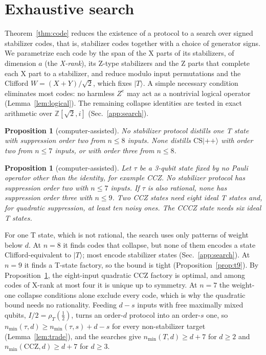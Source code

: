 \documentclass[aps,prl,reprint,twocolumn,amsmath,amssymb,floatfix,nofootinbib,superscriptaddress]{revtex4-2}
\newtheorem{proposition}[theorem]{Proposition}
\newcommand{\CCZ}{\mathrm{CCZ}}
\newcommand{\CS}{\mathrm{CS}}
\newcommand{\TNmax}{8}
\begin{document}
\section{Exhaustive search}
Theorem~\ref{thm:code} reduces the existence of a protocol to a search over signed stabilizer codes, that is, stabilizer codes together with a choice of generator signs. We parametrize each code by the span of the X parts of its stabilizers, of dimension $a$ (the \emph{X-rank}), its Z-type stabilizers and the Z parts that complete each X part to a stabilizer, and reduce modulo input permutations and the Clifford $W=(X+Y)/\sqrt2$, which fixes $|T\rangle$. A simple necessary condition eliminates most codes: no harmless $Z^e$ may act as a nontrivial logical operator (Lemma~\ref{lem:logical}). The remaining collapse identities are tested in exact arithmetic over $\mathbb Z[\sqrt2,i]$ (Sec.~\ref{app:search}).
\begin{proposition}[computer-assisted]\label{thm:tcs}
No stabilizer protocol distills one T state with suppression order two from $n\leq\TNmax$ inputs. None distills $\CS|{+}{+}\rangle$ with order two from $n\leq7$ inputs, or with order three from $n\leq8$.
\end{proposition}
\begin{proposition}[computer-assisted]\label{thm:ccz}
Let $\tau$ be a 3-qubit state fixed by no Pauli operator other than the identity, for example CCZ. No stabilizer protocol has suppression order two with $n\leq7$ inputs. If $\tau$ is also rational, none has suppression order three with $n\leq9$. Two CCZ states need eight ideal T states and, for quadratic suppression, at least ten noisy ones. The CCCZ state needs six ideal T states.
\end{proposition}
For one T state, which is not rational, the search uses only patterns of weight below $d$. At $n=8$ it finds codes that collapse, but none of them encodes a state Clifford-equivalent to $|T\rangle$; most encode stabilizer states (Sec.~\ref{app:search}). At $n=9$ it finds a T-state factory, so the bound is tight (Proposition~\ref{prop:t9}). By Proposition~\ref{thm:ccz}, the eight-input quadratic CCZ factory is optimal, and among codes of X-rank at most four it is unique up to symmetry. At $n=7$ the weight-one collapse conditions alone exclude every code, which is why the quadratic bound needs no rationality. Feeding $d-s$ inputs with free maximally mixed qubits, $I/2=\rho_T(\tfrac12)$, turns an order-$d$ protocol into an order-$s$ one, so $n_{\min}(\tau,d)\geq n_{\min}(\tau,s)+d-s$ for every non-stabilizer target (Lemma~\ref{lem:trade}), and the searches give $n_{\min}(T,d)\geq d+7$ for $d\geq2$ and $n_{\min}(\CCZ,d)\geq d+7$ for $d\geq3$.
\end{document}
